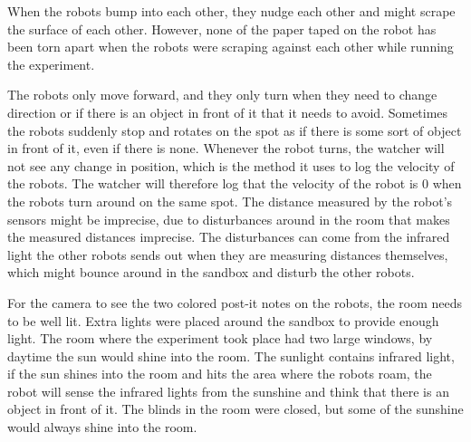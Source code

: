 When the robots bump into each other, they nudge each other and might scrape the surface of each other. However, none of the paper taped on the robot has been torn apart when the robots were scraping against each other while running the experiment.

The robots only move forward, and they only turn when they need to change direction or if there is an object in front of it that it needs to avoid. Sometimes the robots suddenly stop and rotates on the spot as if there is some sort of object in front of it, even if there is none.
Whenever the robot turns, the watcher will not see any change in position, which is the method it uses to log the velocity of the robots. The watcher will therefore log that the velocity of the robot is 0 when the robots turn around on the same spot. 
The distance measured by the robot's sensors might be imprecise, due to disturbances around in the room that makes the measured distances imprecise. The disturbances can come from the infrared light the other robots sends out when they are measuring distances themselves, which might bounce around in the sandbox and disturb the other robots. 

For the camera to see the two colored post-it notes on the robots, the room needs to be well lit. Extra lights were placed around the sandbox to provide enough light. The room where the experiment took place had two large windows, by daytime the sun would shine into the room. The sunlight contains infrared light, if the sun shines into the room and hits the area where the robots roam, the robot will sense the infrared lights from the sunshine and think that there is an object in front of it. The blinds in the room were closed, but some of the sunshine would always shine into the room.